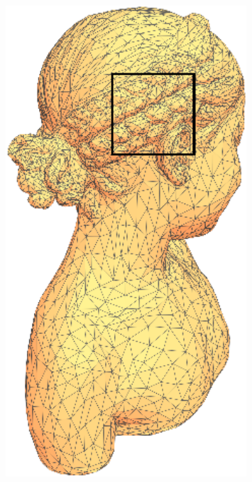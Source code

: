 \begin{figure}[htbp]
\begin{minipage}{0.3\textwidth}
\centering
   \includegraphics[width=0.8\textwidth]{figs/svg/bimba_wireframe_half_line_width_rect.png}
\end{minipage}%
\begin{minipage}[t]{0.7\textwidth}
\centering
   {   \setlength{\fboxsep}{0pt} \setlength{\fboxrule}{1pt} }

\end{minipage}
\end{figure}
